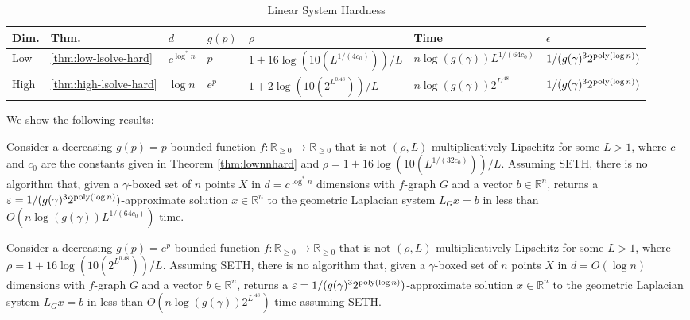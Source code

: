 \begin{table}[!h]
\centering
\begin{tabular}{|l|l|l|l|l|l|l|}
    \hline
   Dim. & Thm. & $d$ & $g(p)$ & $\rho$ & Time & $\epsilon$ \\ \hline
   Low & \ref{thm:low-lsolve-hard} & $c^{\log^* n}$ & $p$ & $1+16 \log( 10 (L^{1/(4c_0)}) ) / L$ & $n \log (g(\gamma)) L^{1/(64c_0)} $ & $1/ ( g(\gamma)^3 2^{\mathrm{poly}(\log n)} )$ \\ \hline
   High & \ref{thm:high-lsolve-hard} & $\log n$ & $e^p$ &  $1+2 \log(10 (2^{L^{0.48}})) /L$ & $n \log(g(\gamma)) 2^{L^{.48}}$ & $1/ ( g(\gamma)^3 2^{\mathrm{poly}(\log n)} )$ \\ \hline
\end{tabular}\caption{Linear System Hardness}\label{tab:lsolve-hard}
\end{table}

We show the following results:


\begin{theorem}\label{thm:low-lsolve-hard}
Consider a decreasing $g(p)=p$-bounded function $f:\mathbb{R}_{\ge 0}\rightarrow \mathbb{R}_{\ge 0}$
that is not $(\rho,L)$-multiplicatively Lipschitz for some $L > 1$, where $c$ and $c_0$ are the constants given in Theorem \ref{thm:lownnhard} and $\rho = 1 + 16\log(10 (L^{1/(32c_0)}))/L$. Assuming {\sf SETH}, there is no algorithm that, given a $\gamma$-boxed set of $n$ points $X$ in $d = c^{\log^* n}$ dimensions with $f$-graph $G$ and a vector $b\in \mathbb{R}^n$, returns a $\varepsilon = 1/(g(\gamma)^3 2^{\mathrm{poly}(\log n)})$-approximate solution $x\in \mathbb{R}^n$ to the geometric Laplacian system $L_G x = b$ in less than $O(n \log(g(\gamma)) L^{1/(64c_0)})$ time.
\end{theorem}


\begin{theorem}\label{thm:high-lsolve-hard}
Consider a decreasing $g(p)=e^p$-bounded function $f:\mathbb{R}_{\ge 0}\rightarrow \mathbb{R}_{\ge 0}$ that is not $(\rho,L)$-multiplicatively Lipschitz for some $L > 1$, where $\rho = 1 + 16\log(10(2^{L^{0.48}}))/L$. Assuming {\sf SETH}, there is no algorithm that, given a $\gamma$-boxed set of $n$ points $X$ in $d = O(\log n)$ dimensions with $f$-graph $G$ and a vector $b\in \mathbb{R}^n$, returns a $\varepsilon = 1/(g(\gamma)^3 2^{\mathrm{poly}(\log n)})$-approximate solution $x\in \mathbb{R}^n$ to the geometric Laplacian system $L_G x = b$ in less than $O(n \log(g(\gamma)) 2^{L^{.48}})$ time assuming {\sf SETH}.
\end{theorem}

